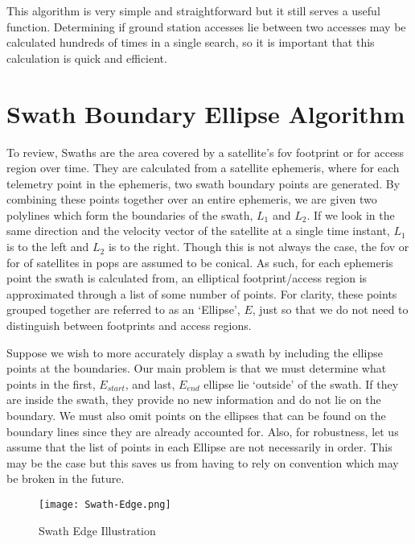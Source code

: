 This algorithm is very simple and straightforward but it still serves a useful
function. Determining if ground station accesses lie between two accesses may
be calculated hundreds of times in a single search, so it is important that
this calculation is quick and efficient.



\section{Swath Boundary Ellipse Algorithm} \label{alg:ellipse}

To review, Swaths are the area covered by a satellite's \gls{fov} footprint or
\gls{for} access region over time. They are calculated from a satellite
ephemeris, where for each telemetry point in the ephemeris, two swath boundary
points are generated. By combining these points together over an entire
ephemeris, we are given two polylines which form the boundaries of the swath,
$L_1$ and $L_2$. If we look in the same direction and the velocity vector of
the satellite at a single time instant, $L_1$ is to the left and $L_2$ is to
the right. Though this is not always the case, the \gls{fov} or \gls{for} of
satellites in \gls{pops} are assumed to be conical. As such, for each ephemeris
point the swath is calculated from, an elliptical footprint/access region is
approximated through a list of some number of points. For clarity, these points
grouped together are referred to as an `Ellipse', $E$, just so that we do not
need to distinguish between footprints and access regions.  

Suppose we wish to more accurately display a swath by including the ellipse
points at the boundaries. Our main problem is that we must determine what
points in the first, $E_{start}$, and last, $E_{end}$ ellipse lie `outside' of the
swath.  If they are inside the swath, they provide no new information and do
not lie on the boundary.  We must also omit points on the ellipses that can be
found on the boundary lines since they are already accounted for. Also, for
robustness, let us assume that the list of points in each Ellipse are not
necessarily in order. This may be the case but this saves us from having to
rely on convention which may be broken in the future.

\begin{figure}[h]
    \centering
    \texttt{[image: Swath-Edge.png]} 
    \caption{Swath Edge Illustration}
    \label{fig:swath-edge}
\end{figure}

